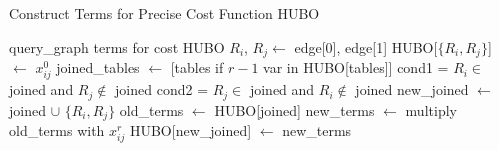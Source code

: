 \begin{algorithm}
\caption{Construct Terms for Precise Cost Function HUBO}
\label{alg:hubo_term_construction}
\begin{algorithmic}[1]
\Require query\_graph
\Ensure terms for cost HUBO
        \State $R_i$, $R_j \gets$ edge[0], edge[1]
            \State HUBO[$\{R_i, R_j\}$] $\gets$ $x_{ij}^{0}$
        \Else
            \State joined\_tables $\gets$ [tables if $r - 1$ var in HUBO[tables]]
                \State cond1 = $R_i \in$ joined and $R_j \notin$ joined
                \State cond2 = $R_j \in$ joined and $R_i \notin$ joined
                    \State new\_joined $\gets$ joined $\cup$ $\{R_i, R_j\}$
                    \State old\_terms $\gets$ HUBO[joined]
                    \State new\_terms $\gets$ multiply old\_terms with $x_{ij}^{r}$
                    \State HUBO[new\_joined] $\gets$ new\_terms
                \EndIf
            \EndFor
        \EndIf
    \EndFor
\EndFor
\end{algorithmic}
\end{algorithm}
